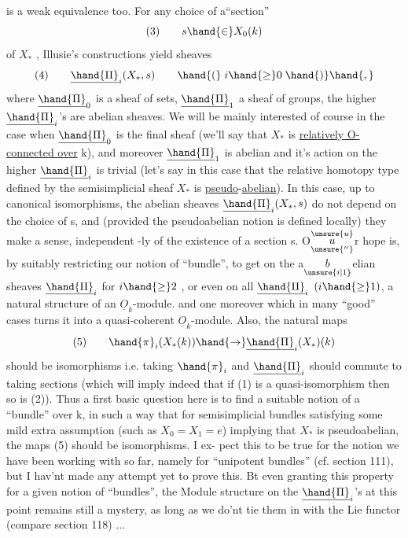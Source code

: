 is a weak equivalence too. 
For any choice of a``section''
\[ (3) \qquad s \hand{\in} X_0(k) \]
of $X_*$ , Illusie's constructions yield sheaves
\[ (4) \qquad \underline{\hand{\Pi}}_i(X_*,s) \qquad \hand{(} \; i \hand{\geq} 0 \; \hand{)}\hand{,} \]
where $\underline{\hand{\Pi}}_0$ is a sheaf of sets, $\underline{\hand{\Pi}}_1$ a sheaf of groups,   the higher
$\underline{\hand{\Pi}}_i$'s  are abelian sheaves. We will be mainly interested of course in the
case when $\underline{\hand{\Pi}}_0$ is the final sheaf (we'll say that $X_*$ is \uline{relatively O-}
\uline{connected over} k), and moreover $\underline{\hand{\Pi}}_1$ is abelian and it's action on
the higher $\underline{\hand{\Pi}}_i$ is trivial (let's say in this case that the relative
homotopy type defined by the semisimplicial sheaf $X_*$ is \uline{pseudo}-\uline{abelian}).
In this case, up to canonical isomorphisms, the  abelian
sheaves $\underline{\hand{\Pi}}_i(X_*,s)$ do not depend on the choice of s, and (provided the
pseudoabelian notion is defined locally) they make a sense, independent%
-ly  of the existence  of a section s. O$\overset{\unsure{u}}{\underset{\unsure{''}}{u}}$r hope is, by suitably
restricting our notion of ``bundle'', to get on the a$\underset{\unsure{i|1}}{b}$elian sheaves $\underline{\hand{\Pi}}_i$
for $i \hand{\geq} 2$ , or even on all $\underline{\hand{\Pi}}_i$ $(i \hand{\geq} 1)$, a natural structure of an
$\underline{O}_k$-module.  and one moreover which in many ``good'' cases turns it
into a quasi-coherent $\underline{O}_k$-module. Also, the natural maps
\[ (5) \qquad \hand{\pi}_i(X_*(k)) \hand{\to} \underline{\hand{\Pi}}_i(X_*)(k) \]
should be isomorphisms\hand{,} i.e. taking $\hand{\pi}_i$ and $\underline{\hand{\Pi}}_i$ should commute to taking
sections (which will imply indeed that if (1) is a quasi-isomorphism
then so is (2)). Thus a first basic question here is to find a suitable
notion of a ``bundle'' over k, in such a way that for semisimplicial
bundles satisfying some mild extra assumption (such as $X_0=X_1=e$) implying
that $X_*$ is pseudoabelian, the maps (5) should be isomorphisms. I ex-%
pect this to be true for the notion we have been working with so far,
namely for ``unipotent bundles'' (cf. section 111), but I hav'nt made
any attempt yet to prove this. Bt even granting this property for
a given notion of ``bundles'', the Module structure on the $\underline{\hand{\Pi}}_i$'s at this
point remains still a mystery,\unsure{\hand{$^*$}} as long as we do'nt tie them in with the
Lie functor (compare section 118) ...

